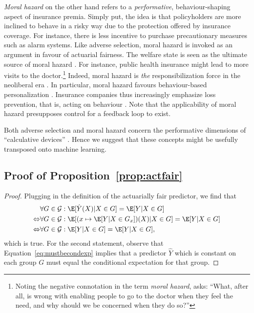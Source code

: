 \documentclass[11pt]{article} %
\begin{document}
\textit{Moral hazard} \citep{heimer1985reactive,baker1996genealogy,baker2000insuring} on the other hand refers to a \textit{performative}, behaviour-shaping aspect of insurance premia. Simply put, the idea is that policyholders are more inclined to behave in a risky way due to the protection offered by insurance coverage. For instance, there is less incentive to purchase precautionary measures such as alarm systems.
Like adverse selection, moral hazard is invoked as an argument in favour of actuarial fairness. The welfare state is seen as the ultimate source of moral hazard \citep{ericson2000moral}. For instance, public health insurance might lead to more visits to the doctor.\footnote{Noting the negative connotation in the term \textit{moral hazard}, \citet{baker1996genealogy} asks: ``What, after all, is wrong
with enabling people to go to the doctor when they feel the need, and why
should we be concerned when they do so?''}
Indeed, moral hazard is \textit{the} responsibilization force in the neoliberal era \citep{ericson2000moral}. In particular, moral hazard favours behaviour-based personalization \citep{verbelen2018unravelling}. Insurance companies thus increasingly emphasize loss prevention, that is, acting on behaviour \citep{baker2002embracing,cevolini2022actuarial}.
Note that the applicability of moral hazard presupposes control for a feedback loop to exist.


Both adverse selection and moral hazard concern the performative dimensions of ``calculative devices'' \citep{van2014politics}. Hence we suggest that these concepts might be usefully transposed onto machine learning.



\subsection{Proof of Proposition~\ref{prop:actfair}}
\label{app:actfairproof}
\begin{proof}
   
Plugging in the definition of the actuarially fair predictor, we find that
        \begin{align}
        \label{eq:mustbecondexp}
        &\forall G \in \mathcal{G}: \E[\hat{Y}(X)|X \in G]=\E[Y|X \in G]\\
\Leftrightarrow &\forall G \in \mathcal{G}: \E[(x \mapsto \E[Y|X \in G_x])(X)|X \in G]=\E[Y|X \in G]\\
\Leftrightarrow &\forall G \in \mathcal{G}: \E[Y|X \in G] = \E[Y|X \in G],
\end{align}
which is true. For the second statement, observe that Equation~\ref{eq:mustbecondexp} implies that a predictor $\hat{Y}$ which is constant on each group $G$ must equal the conditional expectation for that group.
\end{proof}
\end{document}
